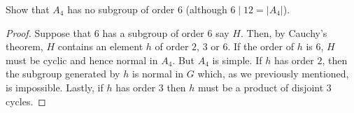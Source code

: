 \begin{problem}
  Show that $A_4$ has no subgroup of order $6$ (although $6\mid 12=|A_4|$).
\end{problem}
\begin{proof}
  Suppose that $6$ has a subgroup of order $6$ say $H$. Then, by Cauchy's
  theorem, $H$ contains an element $h$ of order $2$, $3$ or $6$. If the
  order of $h$ is $6$, $H$ must be cyclic and hence normal in $A_4$. But
  $A_4$ is simple. If $h$ has order $2$, then the subgroup generated by $h$
  is normal in $G$ which, as we previously mentioned, is
  impossible. Lastly, if $h$ has order $3$ then $h$ must be a product of
  disjoint $3$ cycles.
\end{proof}

